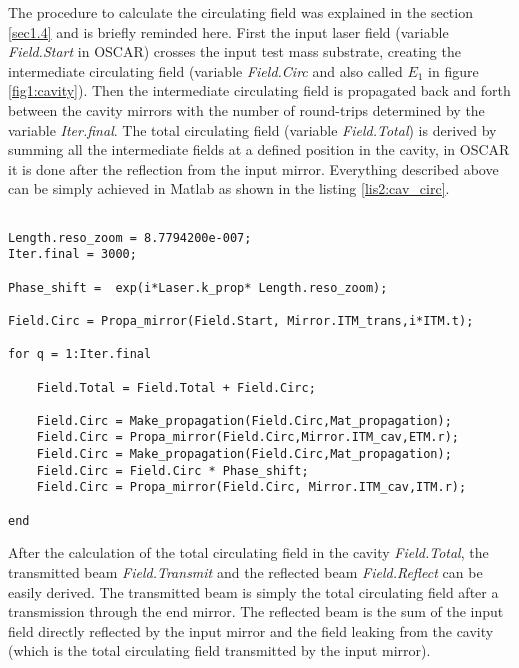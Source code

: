 The procedure to calculate the circulating field was explained in the section \ref{sec1.4} and is briefly reminded here. First the input laser field (variable \emph{Field.Start} in OSCAR) crosses the input test mass substrate, creating the intermediate circulating field (variable \emph{Field.Circ} and also called $E_1$ in figure \ref{fig1:cavity}). Then the intermediate circulating field is propagated back and forth between the cavity mirrors with the number of round-trips determined by the variable \emph{Iter.final}. The total circulating field (variable \emph{Field.Total}) is derived by summing all the intermediate fields at a defined position in the cavity, in OSCAR it is done after the reflection from the input mirror. Everything described above can be simply achieved in Matlab as shown in the listing \ref{lis2:cav_circ}.\\

\begin{lstlisting}[float=htp,caption=The core of the OSCAR program to calculate the circulating field in a cavity\label{lis2:cav_circ},frame=lines]

Length.reso_zoom = 8.7794200e-007;
Iter.final = 3000;

Phase_shift =  exp(i*Laser.k_prop* Length.reso_zoom);

Field.Circ = Propa_mirror(Field.Start, Mirror.ITM_trans,i*ITM.t);

for q = 1:Iter.final

    Field.Total = Field.Total + Field.Circ;

    Field.Circ = Make_propagation(Field.Circ,Mat_propagation);
    Field.Circ = Propa_mirror(Field.Circ,Mirror.ITM_cav,ETM.r);
    Field.Circ = Make_propagation(Field.Circ,Mat_propagation);
    Field.Circ = Field.Circ * Phase_shift;
    Field.Circ = Propa_mirror(Field.Circ, Mirror.ITM_cav,ITM.r);

end

\end{lstlisting}

After the calculation of the total circulating field in the cavity \emph{Field.Total}, the transmitted beam \emph{Field.Transmit} and the reflected beam \emph{Field.Reflect} can be easily derived. The transmitted beam is simply the total circulating field after a transmission through the end mirror. The reflected beam is the sum of the input field directly reflected by the input mirror and the field leaking from the cavity (which is the total circulating field transmitted by the input mirror).\\

